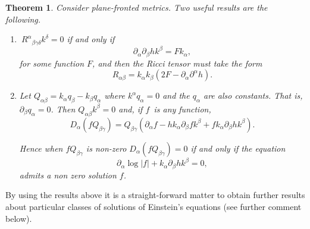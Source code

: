 \documentclass[12pt,a4paper]{article}
\newcounter{theorem}
\newtheorem{theorem}{Theorem}[section]   %
\newcounter{eg}
\def\p{\partial}
\begin{document}
\begin{theorem}

Consider {\em plane-fronted} metrics. Two useful results are the following.

\begin{enumerate}

\item $\ R^{\alpha}{}_{\beta\gamma\delta}k^{\delta}=0$ if and only if%
\begin{equation}
\p_{\alpha}\p_{\beta} h k^{\beta} = Fk_{\alpha},
\end{equation}
for some function $F$, and then the Ricci tensor must take the form%
\begin{equation}
 R_{\alpha\beta} = k_{\alpha}k_{\beta}(2F-\p_\alpha \p^{\alpha} h).
\end{equation}

\item  Let $Q_{\alpha\beta}=k_{\alpha}q_{\beta} - k_{\beta}q_{\alpha}$ 
where $k^{\alpha}q_{\alpha}=0$ and the $q_{\alpha}$
are also constants. That is, $\p_{\beta} q_{\alpha} = 0$. 
Then $Q_{\alpha\beta}k^{\beta} =0$ and, if $f$\ is any function,
\begin{equation}
D_\alpha (fQ_{\beta\gamma}) = Q_{\beta\gamma}(\p_{\alpha}f - 
hk_{\alpha} \p_{\beta}f k^{\beta} +
fk_{\alpha}\p_\beta h k^{\beta}).
\end{equation}

Hence when $fQ_{\beta\gamma}$ is non-zero $D_\alpha(fQ_{\beta\gamma})=0$ if
and only if the equation%
\begin{equation}
\p_\alpha \log |f| + k_{\alpha}\p_\beta h k^{\beta}=0,
\end{equation}
admits a non zero solution $f$.
\end{enumerate}

\end{theorem}
By using the results above it is a straight-forward matter to obtain further
results about particular classes of solutions of Einstein's equations (see
further comment below).
\end{document}
